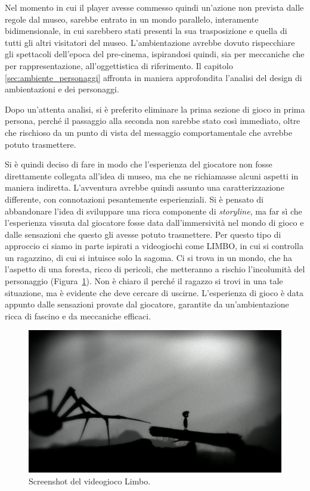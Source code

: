 Nel momento in cui il player avesse commesso quindi un’azione non prevista dalle regole dal museo, sarebbe entrato in un mondo parallelo, interamente bidimensionale, in cui sarebbero stati presenti la sua trasposizione e quella di tutti gli altri visitatori del museo.
L’ambientazione avrebbe dovuto rispecchiare gli spettacoli dell’epoca del pre-cinema, ispirandosi quindi, sia per meccaniche che per rappresentazione, all’oggettistica di riferimento.
Il capitolo \ref{sec:ambiente_personaggi} affronta in maniera approfondita l’analisi del design di ambientazioni e dei personaggi.

Dopo un’attenta analisi, si è preferito eliminare la prima sezione di gioco in prima persona, perché il passaggio alla seconda non sarebbe stato così immediato, oltre che rischioso da un punto di vista del messaggio comportamentale che avrebbe potuto trasmettere.

Si è quindi deciso di fare in modo che l’esperienza del giocatore non fosse direttamente collegata all’idea di museo, ma che ne richiamasse alcuni aspetti in maniera indiretta.
L’avventura avrebbe quindi assunto una caratterizzazione differente, con connotazioni pesantemente esperienziali. Si è pensato di abbandonare l’idea di sviluppare una ricca componente di \textit{storyline}, ma far sì che l’esperienza vissuta dal giocatore fosse data dall’immersività nel mondo di gioco e dalle sensazioni che questo gli avesse potuto trasmettere.
Per questo tipo di approccio ci siamo in parte ispirati a videogiochi come LIMBO, in cui si controlla un ragazzino, di cui si intuisce solo la sagoma. Ci si trova in un mondo, che ha l’aspetto di una foresta, ricco di pericoli, che metteranno a rischio l’incolumità del personaggio (Figura~\ref{fig:level_design_limbo}). Non è chiaro il perché il ragazzo si trovi in una tale situazione, ma è evidente che deve cercare di uscirne. L’esperienza di gioco è data appunto dalle sensazioni provate dal giocatore, garantite da un’ambientazione ricca di fascino e da meccaniche efficaci.

\begin{figure}%
	\centering
	\includegraphics[width= 0.8\columnwidth]{images/gameDesign/38_limbo.jpg}
	\caption{Screenshot del videogioco Limbo.}
	\label{fig:level_design_limbo}
\end{figure}

